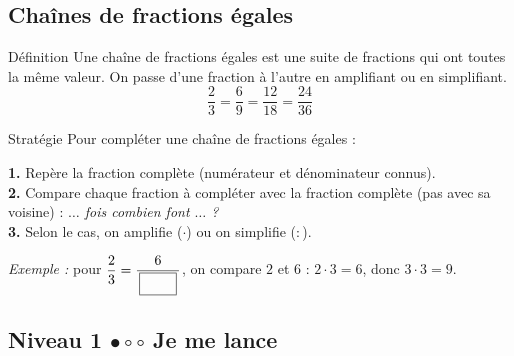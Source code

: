 \subsection{Chaînes de fractions égales}
 
\begin{regle}{Définition}
Une \textcolor{themeColor}{chaîne de fractions égales} est une suite de fractions qui ont toutes la même valeur. On passe d'une fraction à l'autre en amplifiant ou en simplifiant.
\[\dfrac{2}{3}=\dfrac{6}{9}=\dfrac{12}{18}=\dfrac{24}{36}\]
\end{regle}
 
\vspace{15pt}
\begin{astuce}{Stratégie}
Pour compléter une chaîne de fractions égales :
 
\vspace{5pt}
\textbf{1.} Repère la fraction complète (numérateur et dénominateur connus).\\
\textbf{2.} Compare chaque fraction à compléter avec la fraction complète (pas avec sa voisine) : \textit{\og $\ldots$ fois combien font $\ldots$ ?\fg{}}\\
\textbf{3.} Selon le cas, on amplifie ($\cdot$) ou on simplifie ($:$).
 
\vspace{5pt}
\textit{Exemple :} pour $\dfrac{2}{3}=\dfrac{6}{\Case}$, on compare $2$ et $6$ : $2 \cdot 3 = 6$, donc $3 \cdot 3 = 9$.
\end{astuce}
 
 
\newpage
\subsection{Niveau 1 \quad $\bullet\circ\circ$ \quad Je me lance}
 
 

